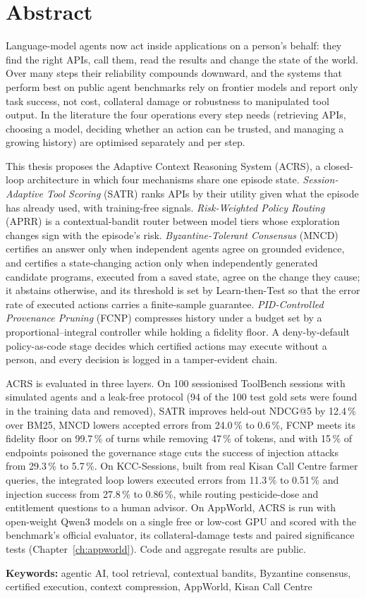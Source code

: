 \chapter*{Abstract}

Language-model agents now act inside applications on a person's behalf: they find the right APIs, call
them, read the results and change the state of the world. Over many steps their reliability compounds
downward, and the systems that perform best on public agent benchmarks rely on frontier models and
report only task success, not cost, collateral damage or robustness to manipulated tool output. In the
literature the four operations every step needs (retrieving APIs, choosing a model, deciding whether an
action can be trusted, and managing a growing history) are optimised separately and per step.

This thesis proposes the Adaptive Context Reasoning System (ACRS), a closed-loop architecture in which
four mechanisms share one episode state. \emph{Session-Adaptive Tool Scoring} (SATR) ranks APIs by their
utility given what the episode has already used, with training-free signals. \emph{Risk-Weighted Policy
Routing} (APRR) is a contextual-bandit router between model tiers whose exploration changes sign with
the episode's risk. \emph{Byzantine-Tolerant Consensus} (MNCD) certifies an answer only when independent
agents agree on grounded evidence, and certifies a state-changing action only when independently
generated candidate programs, executed from a saved state, agree on the change they cause; it abstains
otherwise, and its threshold is set by Learn-then-Test so that the error rate of executed actions carries
a finite-sample guarantee. \emph{PID-Controlled Provenance Pruning} (FCNP) compresses history under a
budget set by a proportional--integral controller while holding a fidelity floor. A deny-by-default
policy-as-code stage decides which certified actions may execute without a person, and every decision
is logged in a tamper-evident chain.

ACRS is evaluated in three layers. On 100 sessionised ToolBench sessions with simulated agents and a
leak-free protocol (94 of the 100 test gold sets were found in the training data and removed), SATR
improves held-out NDCG@5 by 12.4\,\% over BM25, MNCD lowers accepted errors from 24.0\,\% to 0.6\,\%,
FCNP meets its fidelity floor on 99.7\,\% of turns while removing 47\,\% of tokens, and with 15\,\% of
endpoints poisoned the governance stage cuts the success of injection attacks from 29.3\,\% to 5.7\,\%.
On KCC-Sessions, built from real Kisan Call Centre farmer queries, the integrated loop lowers executed
errors from 11.3\,\% to 0.51\,\% and injection success from 27.8\,\% to 0.86\,\%, while routing pesticide-dose
and entitlement questions to a human advisor. On AppWorld, ACRS is run with open-weight Qwen3 models on a
single free or low-cost GPU and scored with the benchmark's official evaluator, its collateral-damage
tests and paired significance tests (Chapter~\ref{ch:appworld}). Code and aggregate results are public.

\vspace{0.4cm}
\noindent\textbf{Keywords:} agentic AI, tool retrieval, contextual bandits, Byzantine consensus,
certified execution, context compression, AppWorld, Kisan Call Centre
